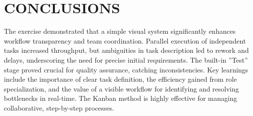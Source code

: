 \chapter{CONCLUSIONS}\label{ch:conclusion}
The exercise demonstrated that a simple visual system significantly enhances workflow
transparency and team coordination. Parallel execution of independent tasks increased
throughput, but ambiguities in task description led to rework and delays, underscoring
the need for precise initial requirements. The built-in ”Test” stage proved crucial for
quality assurance, catching inconsistencies. Key learnings include the importance of
clear task definition, the efficiency gained from role specialization, and the value of a
visible workflow for identifying and resolving bottlenecks in real-time. The Kanban
method is highly effective for managing collaborative, step-by-step processes.

